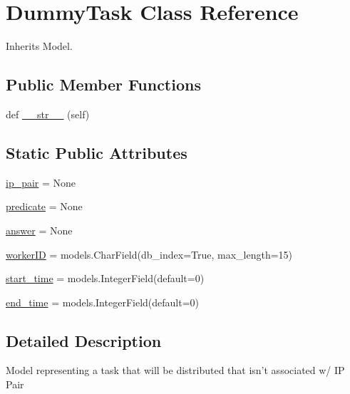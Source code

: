 \hypertarget{classdynamicfilterapp_1_1models_1_1_dummy_task}{}\section{Dummy\+Task Class Reference}
\label{classdynamicfilterapp_1_1models_1_1_dummy_task}


Inherits Model.

\subsection*{Public Member Functions}
\begin{DoxyCompactItemize}
\item 
def \mbox{\hyperlink{classdynamicfilterapp_1_1models_1_1_dummy_task_a23e8041ce1015febe4fdace3225714f9}{\+\_\+\+\_\+str\+\_\+\+\_\+}} (self)
\end{DoxyCompactItemize}
\subsection*{Static Public Attributes}
\begin{DoxyCompactItemize}
\item 
\mbox{\hyperlink{classdynamicfilterapp_1_1models_1_1_dummy_task_a6a81c84f60e4fc0f40d6812d6f6452c7}{ip\+\_\+pair}} = None
\item 
\mbox{\hyperlink{classdynamicfilterapp_1_1models_1_1_dummy_task_a59edc4e3874fffd0c2a9ef88cddfc0fa}{predicate}} = None
\item 
\mbox{\hyperlink{classdynamicfilterapp_1_1models_1_1_dummy_task_a8c4d9ee8d4f82d724070b97e70b9c4e5}{answer}} = None
\item 
\mbox{\hyperlink{classdynamicfilterapp_1_1models_1_1_dummy_task_ab569d6674e112f916cbe81a2304d418f}{worker\+ID}} = models.\+Char\+Field(db\+\_\+index=True, max\+\_\+length=15)
\item 
\mbox{\hyperlink{classdynamicfilterapp_1_1models_1_1_dummy_task_a2530c3908f0179486a4c2255f792e27a}{start\+\_\+time}} = models.\+Integer\+Field(default=0)
\item 
\mbox{\hyperlink{classdynamicfilterapp_1_1models_1_1_dummy_task_aa18736cc12f8beb112bd108c5a09ef8d}{end\+\_\+time}} = models.\+Integer\+Field(default=0)
\end{DoxyCompactItemize}


\subsection{Detailed Description}
\begin{DoxyVerb}Model representing a task that will be distributed that isn't associated w/ IP Pair
\end{DoxyVerb}
 


